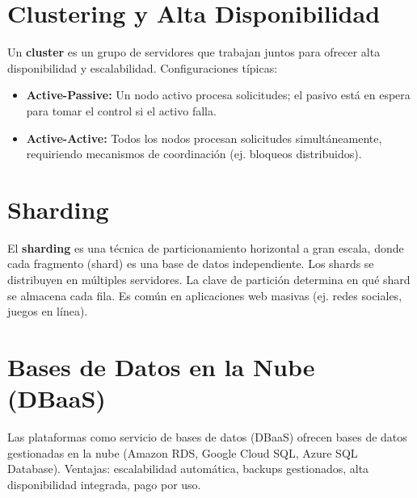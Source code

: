 \documentclass[12pt,a4paper,openany,oneside]{book}
\begin{document}
\section{Clustering y Alta Disponibilidad}
Un \textbf{cluster} es un grupo de servidores que trabajan juntos para ofrecer alta disponibilidad y escalabilidad. Configuraciones típicas:
\begin{itemize}
    \item \textbf{Active-Passive:} Un nodo activo procesa solicitudes; el pasivo está en espera para tomar el control si el activo falla.
    \item \textbf{Active-Active:} Todos los nodos procesan solicitudes simultáneamente, requiriendo mecanismos de coordinación (ej. bloqueos distribuidos).
\end{itemize}

\section{Sharding}
El \textbf{sharding} es una técnica de particionamiento horizontal a gran escala, donde cada fragmento (shard) es una base de datos independiente. Los shards se distribuyen en múltiples servidores. La clave de partición determina en qué shard se almacena cada fila. Es común en aplicaciones web masivas (ej. redes sociales, juegos en línea).

\begin{center}
\end{center}

\section{Bases de Datos en la Nube (DBaaS)}
Las plataformas como servicio de bases de datos (DBaaS) ofrecen bases de datos gestionadas en la nube (Amazon RDS, Google Cloud SQL, Azure SQL Database). Ventajas: escalabilidad automática, backups gestionados, alta disponibilidad integrada, pago por uso.
\end{document}
